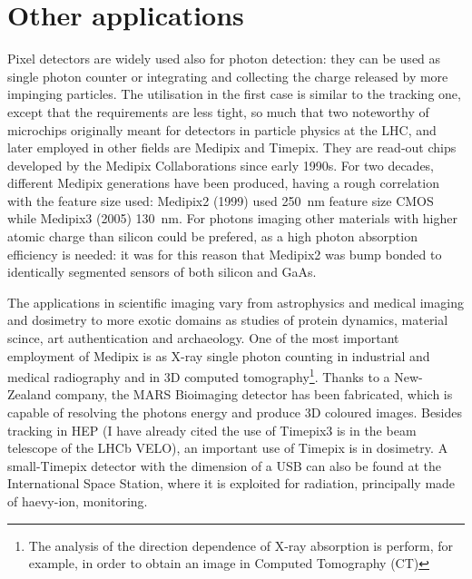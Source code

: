 \section{Other applications}
    Pixel detectors are widely used also for photon detection: they can be used as single photon counter or integrating and collecting the charge released by more impinging particles. The utilisation in the first case is similar to the tracking one, except that the requirements are less tight, so much that two noteworthy of microchips originally meant for detectors in particle physics at the LHC, and later employed in other fields are Medipix and Timepix. They are read-out chips developed by the Medipix Collaborations since early 1990s. For two decades, different Medipix generations have been produced, having a rough correlation with the feature size used: Medipix2 (1999) used \SI{250}{nm} feature size CMOS while Medipix3 (2005) \SI{130}{nm}.
    For photons imaging other materials with higher atomic charge than silicon could be prefered, as a high photon absorption efficiency is needed: it was for this reason that Medipix2 was bump bonded to identically segmented sensors of both silicon and GaAs.\cite{KOSTAMO2008174}
    
    The applications in scientific imaging vary from astrophysics and medical imaging and dosimetry to more exotic domains as studies of protein dynamics, material scince, art authentication and archaeology.
    One of the most important employment of Medipix is as X-ray single photon counting in industrial and medical radiography and in 3D computed tomography\footnote{The analysis of the direction dependence of X-ray absorption is perform, for example, in order to obtain an image in Computed Tomography (CT)}. Thanks to a New-Zealand company, the MARS Bioimaging detector has been fabricated, which is capable of resolving the photons energy and produce 3D coloured images.
    Besides tracking in HEP (I have already cited the use of Timepix3 is in the beam telescope of the LHCb VELO), an important use of Timepix is in dosimetry.
    A small-Timepix detector with the dimension of a USB can also be found at the International Space Station, where it is exploited for radiation, principally made of haevy-ion, monitoring. 
 
